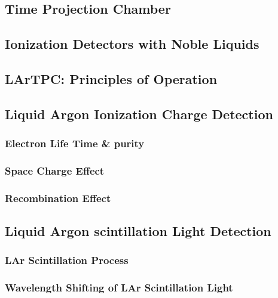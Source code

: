 

\subsection{Time Projection Chamber}
\subsection{Ionization Detectors with Noble Liquids}
\subsection{LArTPC: Principles of Operation}
\subsection{Liquid Argon Ionization Charge Detection}
\subsubsection{Electron Life Time \& purity}
\subsubsection{Space Charge Effect}
\subsubsection{Recombination Effect}
\subsection{Liquid Argon scintillation Light Detection}
\subsubsection{LAr Scintillation Process}
\subsubsection{Wavelength Shifting of LAr Scintillation Light}